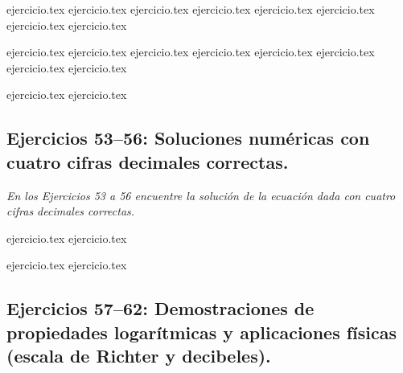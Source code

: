 \begin{enumerate}
    \setcounter{enumi}{34}
    \begin{minipage}{0.45\textwidth}
    {ejercicio.tex}
    {ejercicio.tex}
    {ejercicio.tex}
    {ejercicio.tex}
    {ejercicio.tex}
    {ejercicio.tex}
    {ejercicio.tex}
    {ejercicio.tex}
    \end{minipage}%
    \begin{minipage}{0.45\textwidth}
    {ejercicio.tex}
    {ejercicio.tex}
    {ejercicio.tex}
    {ejercicio.tex}
    {ejercicio.tex}
    {ejercicio.tex}
    {ejercicio.tex}
    {ejercicio.tex}
    \end{minipage}
    
    \setcounter{enumi}{50}
    {ejercicio.tex}
    {ejercicio.tex}
\end{enumerate}

\subsection*{Ejercicios 53--56: Soluciones numéricas con cuatro cifras decimales correctas.}

\noindent \textit{En los Ejercicios 53 a 56 encuentre la solución de la ecuación dada con cuatro cifras decimales correctas.}

\begin{enumerate}
    \setcounter{enumi}{52}
    \begin{minipage}{0.45\textwidth}
    {ejercicio.tex}
    {ejercicio.tex}
    \end{minipage}%
    \begin{minipage}{0.45\textwidth}
    {ejercicio.tex}
    {ejercicio.tex}
    \end{minipage}
\end{enumerate}

\subsection*{Ejercicios 57--62: Demostraciones de propiedades logarítmicas y aplicaciones físicas (escala de Richter y decibeles).}

